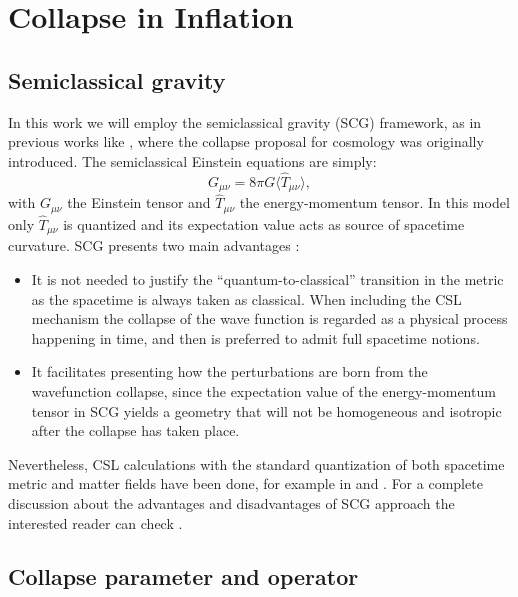 \documentclass[baaa]{baaa}
\begin{document}
\section{Collapse in Inflation} \label{sec4}

\subsection{Semiclassical gravity}

In this work we will employ the semiclassical gravity (SCG) framework, as in previous works like \citep{perezsahlmansudarsky2006}, where the collapse proposal for cosmology was originally introduced. The semiclassical Einstein equations are simply:
\begin{equation}
    G_{\mu\nu} = 8\pi G \langle \hat{T}_{\mu\nu}\rangle ,
\end{equation}
with $G_{\mu\nu}$ the Einstein tensor and $\hat{T}_{\mu\nu}$ the energy-momentum tensor.
In this model only $\hat{T}_{\mu\nu}$ is quantized and its expectation value acts as source of spacetime curvature. SCG presents two main advantages \citep{LeonBengochea2021}:
\begin{itemize}
    \item It is not needed to justify the ``quantum-to-classical'' transition in the metric as the spacetime is always taken as classical. When including the CSL mechanism the collapse of the wave function is regarded as a physical process happening in time, and then is preferred to admit full spacetime notions.
    \item It facilitates presenting how the perturbations are born from the wavefunction collapse, since the expectation value of the energy-momentum tensor in SCG yields a geometry that will not be homogeneous and isotropic after the collapse has taken place. 
\end{itemize}

Nevertheless, CSL calculations with the standard quantization of both spacetime metric and matter fields have been done, for example in \cite{LeonBengochea2016} and \cite{Palermo:2022dim}. For a complete discussion about the advantages and disadvantages of SCG approach the interested reader can check \cite{bengochealeonpearlesudarsky2020}.


\subsection{Collapse parameter and operator}
\end{document}
